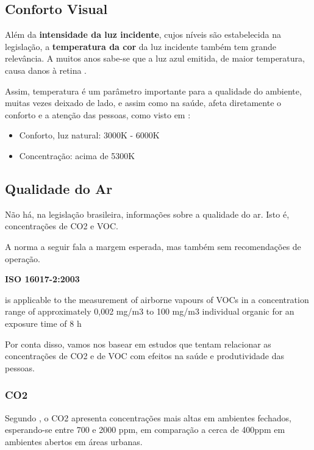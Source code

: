 \documentclass[]{politex}
\begin{document}
\subsection{Conforto Visual} %
Além da \textbf{intensidade da luz incidente}, cujos níveis são estabelecida na legislação, a \textbf{temperatura da cor} da luz incidente também tem grande relevância. A muitos anos sabe-se que a luz azul emitida, de maior temperatura, causa danos à retina \cite{BlueLight}. \par
Assim, temperatura é um parâmetro importante para a qualidade do ambiente, muitas vezes deixado de lado, e assim como na saúde, afeta diretamente o conforto e a atenção das pessoas, como visto em \cite{VisualComfort}: 
\begin{itemize}
\item Conforto, luz natural: 3000K - 6000K
\item Concentração: acima de 5300K 
\end{itemize}

\subsection{Qualidade do Ar} %

Não há, na legislação brasileira, informações sobre a qualidade do ar. Isto é, concentrações de CO2 e VOC. 

A norma a seguir fala a margem esperada, mas também sem recomendações de operação. 

\begin{citacaoLonga} %
\textbf{ISO 16017-2:2003}

is applicable to the measurement of airborne vapours of VOCs in a concentration range of approximately 0,002 mg/m3 to 100 mg/m3 individual organic for an exposure time of 8 h
\end{citacaoLonga}

Por conta disso, vamos nos basear em estudos que tentam relacionar as concentrações de CO2 e de VOC com efeitos na saúde e produtividade das pessoas. 

\subsubsection{CO2}
Segundo \cite{AirQuality}, o CO2 apresenta concentrações mais altas em ambientes fechados, esperando-se entre 700 e 2000 ppm, em comparação a cerca de 400ppm em ambientes abertos em áreas urbanas\cite{co2Earth}. 
\end{document}
